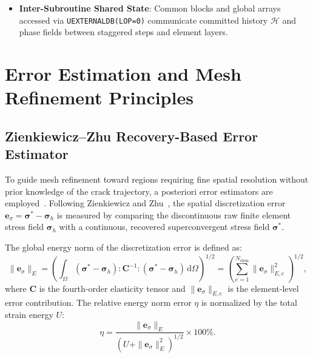 \begin{itemize}
\begin{itemize}
        \item \texttt{SDV19} / \texttt{SDV20}: Area-normalized source quantities $\bar{\psi}_f$ and $\bar{\psi}_e$ with direct source-algebra dimension $\mathrm{kN/mm} = \mathrm{J/mm^2}$ ($E^{(e)} / A_e$); interpretable as volumetric energy densities ($\mathrm{kN/mm^2} = 1\,\mathrm{J/mm^3} = 1000\,\mathrm{mJ/mm^3}$) only under the explicit $1\text{-}\mathrm{mm}$ implicit-thickness convention ($B = 1\,\mathrm{mm}$).
    \end{itemize}
    \item \textbf{Inter-Subroutine Shared State}: Common blocks and global arrays accessed via \texttt{UEXTERNALDB(LOP=0)} communicate committed history $\mathcal{H}$ and phase fields between staggered steps and element layers.
\end{itemize}

\section{Error Estimation and Mesh Refinement Principles}
\label{sec:theory_error_estimation}

\subsection{Zienkiewicz--Zhu Recovery-Based Error Estimator}
To guide mesh refinement toward regions requiring fine spatial resolution without prior knowledge of the crack trajectory, a posteriori error estimators are employed~\cite{badnava2020}. Following Zienkiewicz and Zhu~\cite{zienkiewicz1987,zienkiewicz1992}, the spatial discretization error $\mathbf{e}_\sigma = \boldsymbol{\sigma}^* - \boldsymbol{\sigma}_h$ is measured by comparing the discontinuous raw finite element stress field $\boldsymbol{\sigma}_h$ with a continuous, recovered superconvergent stress field $\boldsymbol{\sigma}^*$.

The global energy norm of the discretization error is defined as:
\begin{equation}
\label{eq:energy_norm_error}
\|\mathbf{e}_\sigma\|_E = \left( \int_\Omega (\boldsymbol{\sigma}^* - \boldsymbol{\sigma}_h) : \mathbf{C}^{-1} : (\boldsymbol{\sigma}^* - \boldsymbol{\sigma}_h) \, \mathrm{d}\Omega \right)^{1/2} = \left( \sum_{e=1}^{N_{\mathrm{elem}}} \|\mathbf{e}_\sigma\|_{E, e}^2 \right)^{1/2},
\end{equation}
where $\mathbf{C}$ is the fourth-order elasticity tensor and $\|\mathbf{e}_\sigma\|_{E, e}$ is the element-level error contribution. The relative energy norm error $\eta$ is normalized by the total strain energy $U$:
\begin{equation}
\label{eq:relative_energy_error}
\eta = \frac{\|\mathbf{e}_\sigma\|_E}{\left( U + \|\mathbf{e}_\sigma\|_E^2 \right)^{1/2}} \times 100\%.
\end{equation}

